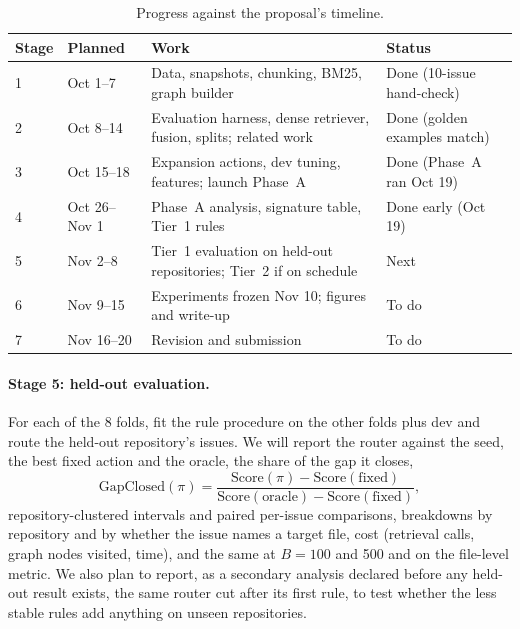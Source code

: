 \documentclass[11pt]{article}
\begin{document}
\begin{table}[t]
\centering
\small
\begin{tabularx}{\textwidth}{@{}l l X l@{}}
\toprule
\textbf{Stage} & \textbf{Planned} & \textbf{Work} & \textbf{Status} \\
\midrule
1 & Oct 1--7   & Data, snapshots, chunking, BM25, graph builder & Done (10-issue hand-check) \\
2 & Oct 8--14  & Evaluation harness, dense retriever, fusion, splits; related work & Done (golden examples match) \\
3 & Oct 15--18 & Expansion actions, dev tuning, features; launch Phase~A & Done (Phase~A ran Oct 19) \\
4 & Oct 26--Nov 1 & Phase~A analysis, signature table, Tier~1 rules & Done early (Oct 19) \\
5 & Nov 2--8   & Tier~1 evaluation on held-out repositories; Tier~2 if on schedule & Next \\
6 & Nov 9--15  & Experiments frozen Nov 10; figures and write-up & To do \\
7 & Nov 16--20 & Revision and submission & To do \\
\bottomrule
\end{tabularx}
\caption{Progress against the proposal's timeline.}
\label{tab:timeline}
\end{table}

\paragraph{Stage 5: held-out evaluation.} For each of the 8 folds, fit the
rule procedure on the other folds plus dev and route the held-out
repository's issues. We will report the router against the seed, the best
fixed action and the oracle, the share of the gap it closes,
\begin{equation}
  \mathrm{GapClosed}(\pi) =
  \frac{\mathrm{Score}(\pi) - \mathrm{Score}(\text{fixed})}
       {\mathrm{Score}(\text{oracle}) - \mathrm{Score}(\text{fixed})},
\end{equation}
repository-clustered intervals and paired per-issue comparisons, breakdowns by
repository and by whether the issue names a target file, cost (retrieval calls,
graph nodes visited, time), and the same at $B=100$ and 500 and on the
file-level metric. We also plan to report, as a secondary analysis declared before any
held-out result exists, the same router cut after its first rule, to test
whether the less stable rules add anything on unseen repositories.
\end{document}
